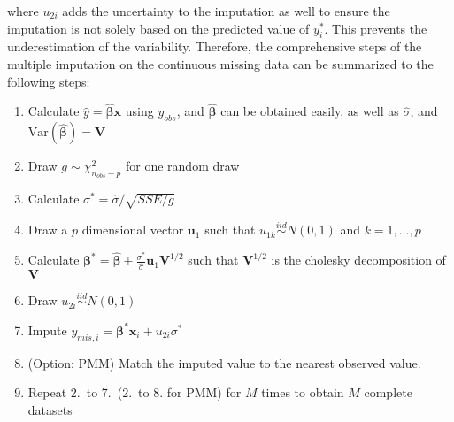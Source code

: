 where $u_{2i}$ adds the uncertainty to the imputation as well to ensure the imputation is not solely based on the predicted value of $y_i^*$. 
This prevents the underestimation of the variability. 
Therefore, the comprehensive steps of the multiple imputation on the continuous missing data can be summarized to the following steps: 
\begin{enumerate} 
    \item Calculate $\hat{y}=\hat{\boldsymbol{\beta}}\mathbf{x}$ using $y_{obs}$, and $\hat{\boldsymbol{\beta}}$ can be obtained easily, as well as $\hat{\sigma}$, and $\text{Var}(\hat{\boldsymbol{\beta}})=\mathbf{V}$
    \item Draw $g\sim \chi^2_{n_{obs}-p}$ for one random draw 
    \item Calculate $\sigma^*=\hat{\sigma}/\sqrt{SSE/g}$
    \item Draw a $p$ dimensional vector $\mathbf{u}_1$ such that $u_{1k}\stackrel{iid}{\sim} N(0,1)$ and $k=1,\ldots,p$
    \item Calculate $\boldsymbol{\beta}^*=\hat{\boldsymbol{\beta}}+\frac{\sigma^*}{\hat{\sigma}}\mathbf{u}_1\mathbf{V}^{1/2}$ such that $\mathbf{V}^{1/2}$ is the cholesky decomposition of $\mathbf{V}$
    \item Draw $u_{2i}\stackrel{iid}{\sim} N(0,1)$ 
    \item Impute $y_{mis,i}=\boldsymbol{\beta}^*\mathbf{x}_i+u_{2i}\sigma^*$ 
    \item (Option: PMM) Match the imputed value to the nearest observed value.
    \item Repeat 2.\ to 7.\ (2.\ to 8. for PMM) for $M$ times to obtain $M$ complete datasets
\end{enumerate}

